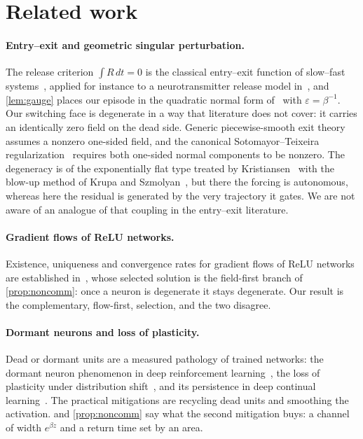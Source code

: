 \documentclass[11pt]{article}
\theoremstyle{definition}
\theoremstyle{remark}
\begin{document}
\section{Related work}\label{sec:related}

\paragraph{Entry--exit and geometric singular perturbation.}
The release criterion $\int R\,dt=0$ is the classical entry--exit function of
slow--fast systems~\cite[Theorem 1.1]{DMS16}, applied for instance to a
neurotransmitter release model in~\cite{SDR23}, and \cref{lem:gauge} places our
episode in the quadratic normal form of~\cite[equations~(1.9) and~(1.10)]{DMS16} with
$\varepsilon=\beta^{-1}$. Our switching face is degenerate in a way that
literature does not cover: it carries an identically zero field on the dead side.
Generic piecewise-smooth exit theory~\cite{Jef16,GH15,GH22} assumes a nonzero
one-sided field, and the canonical Sotomayor--Teixeira
regularization~\cite{ST98,LST07} requires both one-sided normal components to be
nonzero. The degeneracy is of the exponentially flat type treated by
Kristiansen~\cite{Kri17} with the blow-up method of Krupa and
Szmolyan~\cite{KS01}, but there the forcing is autonomous, whereas here the
residual is generated by the very trajectory it gates. We are not aware of an
analogue of that coupling in the entry--exit literature.

\paragraph{Gradient flows of ReLU networks.}
Existence, uniqueness and convergence rates for gradient flows of ReLU networks
are established in~\cite{EJRW23}, whose selected solution is the field-first
branch of \cref{prop:noncomm}: once a neuron is degenerate it stays degenerate.
Our result is the complementary, flow-first, selection, and the two disagree.

\paragraph{Dormant neurons and loss of plasticity.}
Dead or dormant units are a measured pathology of trained networks: the dormant
neuron phenomenon in deep reinforcement learning~\cite{Sokar23}, the loss of
plasticity under distribution shift~\cite{Lyle23}, and its persistence in deep
continual learning~\cite{Dohare24}. The practical mitigations are recycling dead
units and smoothing the activation.  and \cref{prop:noncomm} say
what the second mitigation buys: a channel of width $e^{\beta z}$ and a return
time set by an area.
\end{document}

